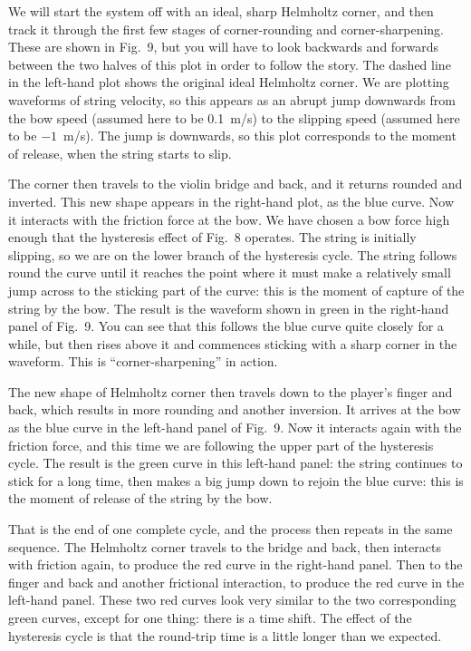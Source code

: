   We will start the system off with an ideal, sharp Helmholtz corner, and then 
  track it through the first few stages of corner-rounding and 
  corner-sharpening. These are shown in Fig.\ 9, but you will have to look 
  backwards and forwards between the two halves of this plot in order to follow 
  the story. The dashed line in the left-hand plot shows the original ideal 
  Helmholtz corner. We are plotting waveforms of string velocity, so this 
  appears as an abrupt jump downwards from the bow speed (assumed here to be 
  0.1~m/s) to the slipping speed (assumed here to be $-1$~m/s). The jump is 
  downwards, so this plot corresponds to the moment of release, when the string 
  starts to slip. 

  The corner then travels to the violin bridge and back, and it returns rounded 
  and inverted. This new shape appears in the right-hand plot, as the blue 
  curve. Now it interacts with the friction force at the bow. We have chosen a 
  bow force high enough that the hysteresis effect of Fig.\ 8 operates. The 
  string is initially slipping, so we are on the lower branch of the hysteresis 
  cycle. The string follows round the curve until it reaches the point where it 
  must make a relatively small jump across to the sticking part of the curve: 
  this is the moment of capture of the string by the bow. The result is the 
  waveform shown in green in the right-hand panel of Fig.\ 9. You can see that 
  this follows the blue curve quite closely for a while, but then rises above 
  it and commences sticking with a sharp corner in the waveform. This is 
  “corner-sharpening” in action. 

  The new shape of Helmholtz corner then travels down to the player’s finger 
  and back, which results in more rounding and another inversion. It arrives at 
  the bow as the blue curve in the left-hand panel of Fig.\ 9. Now it interacts 
  again with the friction force, and this time we are following the upper part 
  of the hysteresis cycle. The result is the green curve in this left-hand 
  panel: the string continues to stick for a long time, then makes a big jump 
  down to rejoin the blue curve: this is the moment of release of the string by 
  the bow. 

  That is the end of one complete cycle, and the process then repeats in the 
  same sequence. The Helmholtz corner travels to the bridge and back, then 
  interacts with friction again, to produce the red curve in the right-hand 
  panel. Then to the finger and back and another frictional interaction, to 
  produce the red curve in the left-hand panel. These two red curves look very 
  similar to the two corresponding green curves, except for one thing: there is 
  a time shift. The effect of the hysteresis cycle is that the round-trip time 
  is a little longer than we expected. 

